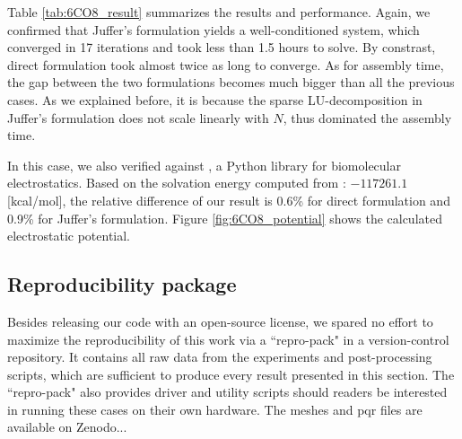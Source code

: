 Table \ref{tab:6CO8_result} summarizes the results and performance.
Again, we confirmed that Juffer's formulation yields a well-conditioned system, which converged in 17 iterations and took less than 1.5 hours to solve.
By constrast, direct formulation took almost twice as long to converge.
As for assembly time, the gap between the two formulations becomes much bigger than all the previous cases.
As we explained before, it is because the sparse LU-decomposition in Juffer's formulation does not scale linearly with $N$, thus dominated the assembly time.

In this case, we also verified against \pygbe, a Python \bem library for biomolecular electrostatics.
Based on the solvation energy computed from \pygbe: $-117261.1$ [kcal/mol], the relative difference of our result is 0.6\% for direct formulation and 0.9\% for Juffer's formulation.
Figure \ref{fig:6CO8_potential} shows the calculated electrostatic potential.

\subsection{Reproducibility package}

Besides releasing our code with an open-source license, we spared no effort to maximize the reproducibility of this work via a ``repro-pack" in a version-control repository.
It contains all raw data from the experiments and post-processing scripts, which are sufficient to produce every result presented in this section.
The ``repro-pack" also provides driver and utility scripts should readers be interested in running these cases on their own hardware.
The meshes and pqr files are available on Zenodo...